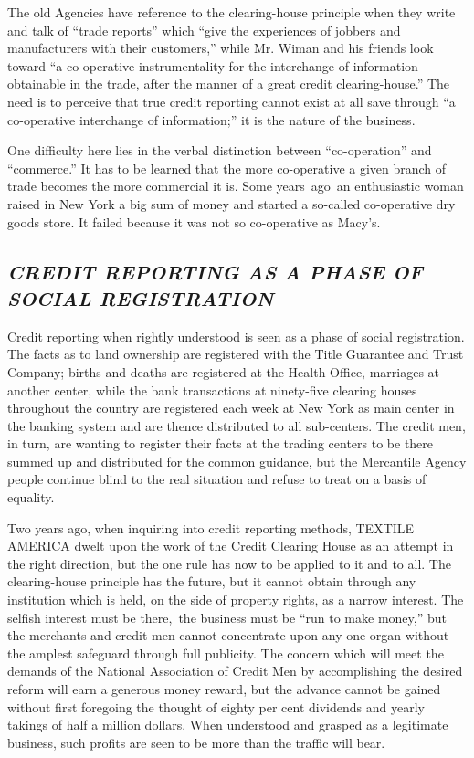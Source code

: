 \documentclass[openany,nobib]{tufte-book}
\begin{document}
The old Agencies have reference to the clearing-house principle when
they write and talk of ``trade reports'' which ``give the experiences of
jobbers and manufacturers with their customers,'' while Mr. Wiman and
his friends look toward ``a co-operative instrumentality for the
interchange of information obtainable in the trade, after the manner of
a great credit clearing-house.'' The need is to perceive that true
credit reporting cannot exist at all save through ``a co-operative
interchange of information;'' it is the nature of the business.~

One difficulty here lies in the verbal distinction between
``co-operation'' and ``commerce.'' It has to be learned that the more
co-operative a given branch of trade becomes the more commercial it is.
Some years~ago~an enthusiastic woman raised in New York a big sum of
money and started a so-called co-operative dry goods store. It failed
because it was not so co-operative as Macy's.~

\enlargethispage{\baselineskip}

\hypertarget{credit-reporting-as-a-phase-of-social-registration}{%
\subsection{\texorpdfstring{\emph{CREDIT REPORTING AS A PHASE OF
SOCIAL
REGISTRATION}~}{CREDIT REPORTING AS A PHASE OF SOCIAL REGISTRATION~}}\label{credit-reporting-as-a-phase-of-social-registration}}

Credit reporting when rightly understood is seen as a phase of social
registration. The facts as to land ownership are registered with the
Title Guarantee and Trust Company; births and deaths are registered at
the Health Office, marriages at another center, while the bank
transactions at ninety-five clearing houses throughout the country are
registered each week at New York as main center in the banking system
and are thence distributed to all sub-centers. The credit men, in turn,
are wanting to register their facts at the trading centers to be there
summed up and distributed for the common guidance, but the Mercantile
Agency people continue blind to the real situation and refuse to treat
on a basis of equality.~

Two years ago, when inquiring into credit reporting methods, TEXTILE
AMERICA dwelt upon the work of the Credit Clearing House as an attempt
in the right direction, but the one rule has now to be applied to it and
to all. The clearing-house principle has the future, but it cannot
obtain through any institution which is held, on the side of property
rights, as a narrow interest. The selfish interest must be there,~the
business must be ``run to make money,'' but the merchants and credit men
cannot concentrate upon any one organ without the amplest safeguard
through full publicity. The concern which will meet the demands of the
National Association of Credit Men by accomplishing the desired reform
will earn a generous money reward, but the advance cannot be gained
without first foregoing the thought of eighty per cent dividends and
yearly takings of half a million dollars. When understood and grasped as
a legitimate business, such profits are seen to be more than the traffic
will bear.~
\end{document}
